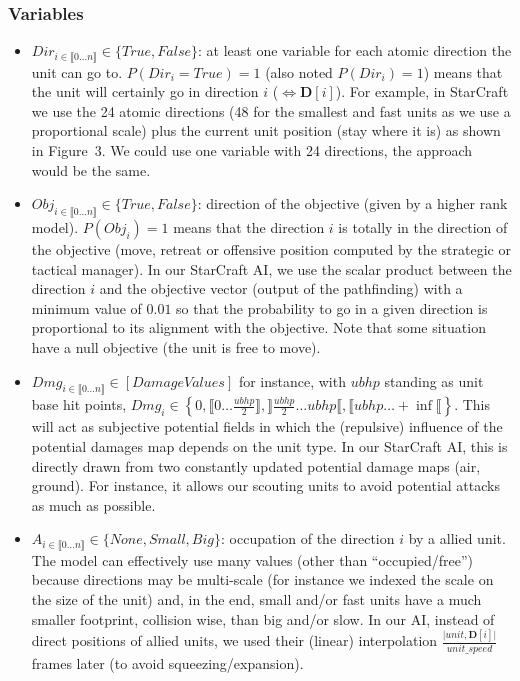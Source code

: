 \subsubsection{Variables}
\begin{itemize}
\item $Dir_{i \in \llbracket 0 \dots n\rrbracket } \in \{True, False\}$: at least one variable for each atomic direction the unit can go to. $P(Dir_i = True) = 1$ (also noted $P(Dir_i) = 1$) means that the unit will certainly go in direction $i$ ($\Leftrightarrow \mathbf{D}[i]$). For example, in StarCraft we use the 24 atomic directions (48 for the smallest and fast units as we use a proportional scale) plus the current unit position (stay where it is) as shown in Figure~3. We could use one variable with 24 directions, the approach would be the same. %
\item $Obj_{i \in \llbracket 0 \dots n\rrbracket } \in \{True, False\}$: direction of the objective (given by a higher rank model). $P(Obj_i) = 1$ means that the direction $i$ is totally in the direction of the objective (move, retreat or offensive position computed by the strategic or tactical manager). In our StarCraft AI, we use the scalar product between the direction $i$ and the objective vector (output of the pathfinding) with a minimum value of $0.01$ so that the probability to go in a given direction is proportional to its alignment with the objective. Note that some situation have a null objective (the unit is free to move).
\item $Dmg_{i \in \llbracket 0 \dots n\rrbracket } \in [Damage Values]$ for instance, with $ubhp$ standing as unit base hit points, $Dmg_i \in \left\{0, \llbracket 0\dots \frac{ubhp}{2}\rrbracket, \rrbracket \frac{ubhp}{2} \dots ubhp\llbracket, \llbracket ubhp \dots +\inf\llbracket \right\}$. This will act as subjective potential fields \citep{Hagelback2009} in which the (repulsive) influence of the potential damages map depends on the unit type. In our StarCraft AI, this is directly drawn from two constantly updated potential damage maps (air, ground). For instance, it allows our scouting units to avoid potential attacks as much as possible.
\item $A_{i \in \llbracket 0 \dots n\rrbracket } \in \{None, Small, Big\}$: occupation of the direction $i$ by a allied unit. The model can effectively use many values (other than ``occupied/free'') because directions may be multi-scale (for instance we indexed the scale on the size of the unit) and, in the end, small and/or fast units have a much smaller footprint, collision wise, than big and/or slow. In our AI, instead of direct positions of allied units, we used their (linear) interpolation $\frac{\mathbf{|}unit, \mathbf{D}[i]\mathbf{|}}{unit\_speed}$ frames later (to avoid squeezing/expansion).

\end{itemize}

